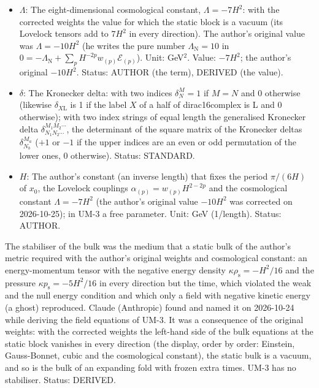 \documentclass[
  10pt,
]{article}
\begin{document}
\begin{itemize}
  variation of \(\sqrt{\lvert g\rvert}\,\mathcal{L}_{(p)}\) with respect
  to \(g^{MN}\); \(\mathcal{E}_{(1)}\) the Einstein tensor,
  \(\mathcal{E}_{(2)}\) the Gauss-Bonnet tensor, \(\mathcal{E}_{(3)}\)
  the cubic Lovelock tensor); with frame indices its frame components.
  Unit: 1/length\(^{2p}\). Status: STANDARD.
\item
  \(\Lambda\): The eight-dimensional cosmological constant,
  \(\Lambda = -7H^2\): with the corrected weights the value for which
  the static block is a vacuum (its Lovelock tensors add to \(7H^2\) in
  every direction). The author's original value was \(\Lambda = -10H^2\)
  (he writes the pure number \(\Lambda_{\mathrm{N}} = 10\) in
  \(0 = -\Lambda_{\mathrm{N}} + \sum_p H^{-2p}w_{(p)}\mathcal{E}_{(p)}\)).
  Unit: GeV\(^2\). Value: \(-7H^2\); the author's original \(-10H^2\).
  Status: AUTHOR (the term), DERIVED (the value).
\item
  \(\delta\): The Kronecker delta: with two indices \(\delta^M_N = 1\)
  if \(M = N\) and 0 otherwise (likewise \(\delta_{X\mathrm{L}}\) is 1
  if the label \(X\) of a half of dirac16complex is L and 0 otherwise);
  with two index strings of equal length the generalised Kronecker delta
  \(\delta^{M_1M_2\cdots}_{N_1N_2\cdots}\), the determinant of the
  square matrix of the Kronecker deltas \(\delta^{M_a}_{N_b}\) (\(+1\)
  or \(-1\) if the upper indices are an even or odd permutation of the
  lower ones, 0 otherwise). Status: STANDARD.
\item
  \(H\): The author's constant (an inverse length) that fixes the period
  \(\pi/(6H)\) of \(x_0\), the Lovelock couplings
  \(\alpha_{(p)} = w_{(p)}H^{2-2p}\) and the cosmological constant
  \(\Lambda = -7H^2\) (the author's original value \(-10H^2\) was
  corrected on 2026-10-25); in UM-3 a free parameter. Unit: GeV
  (1/length). Status: AUTHOR.
\end{itemize}

The stabiliser of the bulk was the medium that a static bulk of the
author's metric required with the author's original weights and
cosmological constant: an energy-momentum tensor with the negative
energy density \(\kappa\rho_{\mathrm{s}} = -H^2/16\) and the pressure
\(\kappa p_{\mathrm{s}} = -5H^2/16\) in every direction but the time,
which violated the weak and the null energy condition and which only a
field with negative kinetic energy (a ghost) reproduced. Claude
(Anthropic) found and named it on 2026-10-24 while deriving the field
equations of UM-3. It was a consequence of the original weights: with
the corrected weights the left-hand side of the bulk equations at the
static block vanishes in every direction (the display, order by order:
Einstein, Gauss-Bonnet, cubic and the cosmological constant), the static
bulk is a vacuum, and so is the bulk of an expanding fold with frozen
extra times. UM-3 has no stabiliser. Status: DERIVED.
\end{document}
